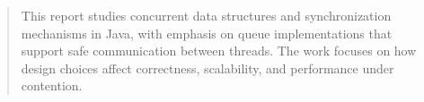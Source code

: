 \begin{abstract}
This report studies concurrent data structures and synchronization mechanisms in Java, with emphasis on queue implementations that support safe communication between threads. The work focuses on how design choices affect correctness, scalability, and performance under contention.
\end{abstract}
